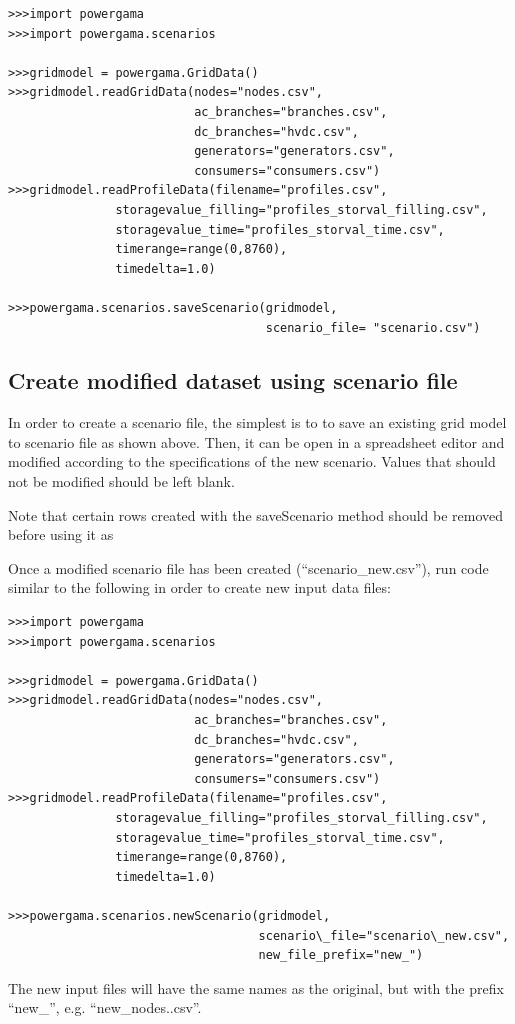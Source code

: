 \documentclass{article}
\begin{document}
\begin{lstlisting}
>>>import powergama
>>>import powergama.scenarios

>>>gridmodel = powergama.GridData()
>>>gridmodel.readGridData(nodes="nodes.csv",
                          ac_branches="branches.csv",
                          dc_branches="hvdc.csv",
                          generators="generators.csv",
                          consumers="consumers.csv")
>>>gridmodel.readProfileData(filename="profiles.csv",
               storagevalue_filling="profiles_storval_filling.csv",
               storagevalue_time="profiles_storval_time.csv",
               timerange=range(0,8760), 
               timedelta=1.0)

>>>powergama.scenarios.saveScenario(gridmodel, 
                                    scenario_file= "scenario.csv")
\end{lstlisting}

\subsection{Create modified dataset using scenario file}
In order to create a scenario file, the simplest is to to save an existing grid model to scenario file as shown above. Then, it can be open in a spreadsheet editor and modified according to the specifications of the new scenario. Values that should not be modified should be left blank.

Note that certain rows created with the saveScenario method  should be removed before using it as 

Once a modified scenario file has been created (``scenario\_new.csv''), run code similar to the following in order to create new input data files:

\begin{lstlisting}
>>>import powergama
>>>import powergama.scenarios

>>>gridmodel = powergama.GridData()
>>>gridmodel.readGridData(nodes="nodes.csv",
                          ac_branches="branches.csv",
                          dc_branches="hvdc.csv",
                          generators="generators.csv",
                          consumers="consumers.csv")
>>>gridmodel.readProfileData(filename="profiles.csv",
               storagevalue_filling="profiles_storval_filling.csv",
               storagevalue_time="profiles_storval_time.csv",
               timerange=range(0,8760), 
               timedelta=1.0)
            
>>>powergama.scenarios.newScenario(gridmodel, 
                                   scenario\_file="scenario\_new.csv", 
                                   new_file_prefix="new_")
\end{lstlisting}
The new input files will have the same names as the original, but with the prefix ``new\_'', e.g. ``new\_nodes..csv''.
\end{document}
